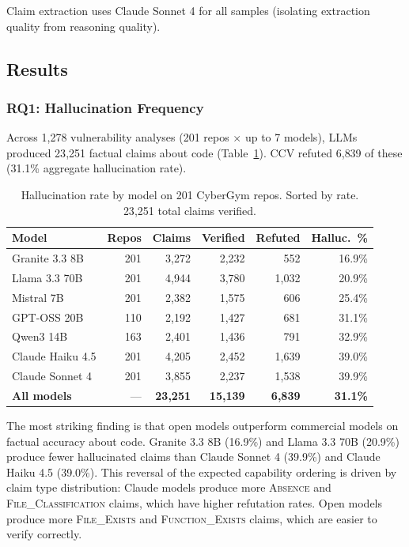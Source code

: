 Claim extraction uses Claude Sonnet 4 for all samples (isolating extraction quality from reasoning quality).

\subsection{Results}

\subsubsection{RQ1: Hallucination Frequency}

Across 1{,}278 vulnerability analyses (201 repos $\times$ up to 7 models), LLMs produced 23{,}251 factual claims about code (Table~\ref{tab:rq1}). CCV refuted 6{,}839 of these (31.1\% aggregate hallucination rate).

\begin{table}[t]
\centering
\caption{Hallucination rate by model on 201 CyberGym repos. Sorted by rate. 23{,}251 total claims verified.}
\label{tab:rq1}
\small
\begin{tabular}{lrrrrr}
\toprule
\textbf{Model} & \textbf{Repos} & \textbf{Claims} & \textbf{Verified} & \textbf{Refuted} & \textbf{Halluc.\ \%} \\
\midrule
Granite 3.3 8B & 201 & 3{,}272 & 2{,}232 & 552 & 16.9\% \\
Llama 3.3 70B & 201 & 4{,}944 & 3{,}780 & 1{,}032 & 20.9\% \\
Mistral 7B & 201 & 2{,}382 & 1{,}575 & 606 & 25.4\% \\
GPT-OSS 20B & 110 & 2{,}192 & 1{,}427 & 681 & 31.1\% \\
Qwen3 14B & 163 & 2{,}401 & 1{,}436 & 791 & 32.9\% \\
Claude Haiku 4.5 & 201 & 4{,}205 & 2{,}452 & 1{,}639 & 39.0\% \\
Claude Sonnet 4 & 201 & 3{,}855 & 2{,}237 & 1{,}538 & 39.9\% \\
\midrule
\textbf{All models} & --- & \textbf{23{,}251} & \textbf{15{,}139} & \textbf{6{,}839} & \textbf{31.1\%} \\
\bottomrule
\end{tabular}
\end{table}

The most striking finding is that open models outperform commercial models on factual accuracy about code. Granite 3.3 8B (16.9\%) and Llama 3.3 70B (20.9\%) produce fewer hallucinated claims than Claude Sonnet 4 (39.9\%) and Claude Haiku 4.5 (39.0\%). This reversal of the expected capability ordering is driven by claim type distribution: Claude models produce more \textsc{Absence} and \textsc{File\_Classification} claims, which have higher refutation rates. Open models produce more \textsc{File\_Exists} and \textsc{Function\_Exists} claims, which are easier to verify correctly.

